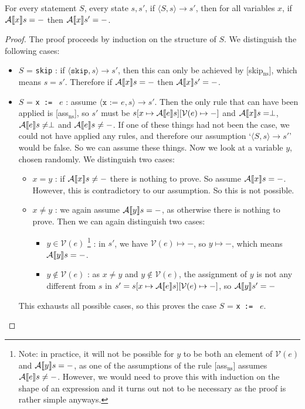 \begin{theorem}
For every statement $S$, every state $s, s'$, if $\langle S, s \rangle \to s'$, then for all variables $x$, if $\mathcal{A} \llbracket x \rrbracket s = -$ then $\mathcal{A} \llbracket x \rrbracket s' = -$.
\end{theorem}

\begin{proof}
The proof proceeds by induction on the structure of $S$. We distinguish the following cases:
\begin{itemize}[noitemsep]

    \item $S$ = \texttt{skip} : if $\langle \texttt{skip}, s \rangle \to s'$, then this can only be achieved by [skip$_{\textrm{ns}}$], which means $s=s'$. Therefore if $\mathcal{A} \llbracket x \rrbracket s = -$ then $\mathcal{A} \llbracket x \rrbracket s' = -$. 
    
    \item $S$ = \texttt{x := } $e$ : assume $\langle \texttt{x := } e, s \rangle \to s'$. Then the only rule that can have been applied is [ass$_{\textrm{ns}}$], so  $s'$ must be $s[x \mapsto \mathcal{A} \llbracket e \rrbracket s][\mathcal{V}(e)\mapsto-]$ and $\mathcal{A} \llbracket x \rrbracket s = \perp$, $\mathcal{A} \llbracket e \rrbracket s \neq \perp$ and $\mathcal{A} \llbracket e \rrbracket s \neq -$. If one of these things had not been the case, we could not have applied any rules, and therefore our assumption `$\langle S, s \rangle \to s'$' would be false. So we can assume these things. Now we look at a variable $y$, chosen randomly. We distinguish two cases:
    \begin{itemize}
        \item $x=y$ : if $\mathcal{A} \llbracket x \rrbracket s \not = -$ there is nothing to prove. So assume $\mathcal{A} \llbracket x \rrbracket s = -$. However, this is contradictory to our assumption. So this is not possible.
        \item $x\not = y$ : we again assume $\mathcal{A} \llbracket y \rrbracket s = -$, as otherwise there is nothing to prove. Then we can again distinguish two cases: 
        \begin{itemize}
            \item $y \in \mathcal{V}(e)$ \footnote{Note: in practice, it will not be possible for $y$ to be both an element of $\mathcal{V}(e)$ and $\mathcal{A} \llbracket y \rrbracket s = -$, as one of the assumptions of the rule [ass$_{\textrm{ns}}$] assumes $\mathcal{A} \llbracket e \rrbracket s \neq -$. However, we would need to prove this with induction on the shape of an expression and it turns out not to be necessary as the proof is rather simple anyways.} : in $s'$, we have $\mathcal{V}(e)\mapsto-$, so $y \mapsto -$, which means $\mathcal{A} \llbracket y \rrbracket s = -$.
            \item $y \not \in \mathcal{V}(e)$ : as $x \not = y$ and $y \not \in \mathcal{V}(e)$, the assignment of $y$ is not any different from $s$ in $s'=s[x \mapsto \mathcal{A} \llbracket e \rrbracket s][\mathcal{V}(e)\mapsto-]$, so $\mathcal{A} \llbracket y \rrbracket s' = -$
        \end{itemize}
    \end{itemize}
    This exhausts all possible cases, so this proves the case $S$ = \texttt{x := } $e$.
    

\end{itemize}
\end{proof}
